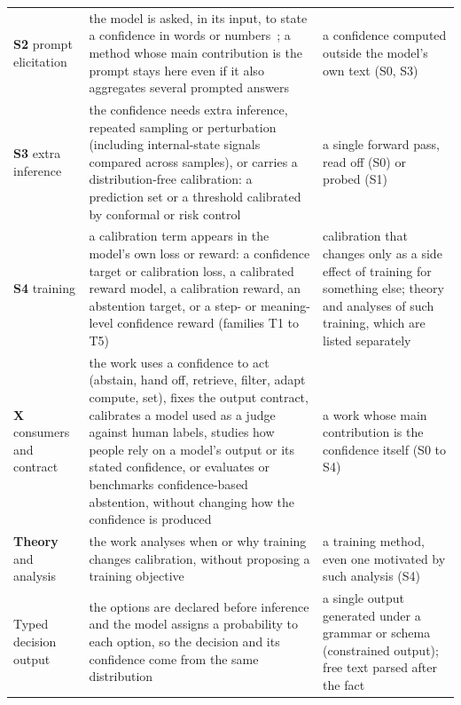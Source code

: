 {\begin{longtable}{@{}>{\raggedright\arraybackslash}p{}
                   >{\raggedright\arraybackslash}p{}
                   >{\raggedright\arraybackslash}p{}@{}}
\textcolor{stS2txt}{\textbf{S2}} prompt elicitation & the model is asked, in its input, to state a confidence in words or numbers~\citep{tian2023just}; a method whose main contribution is the prompt stays here even if it also aggregates several prompted answers & a confidence computed outside the model's own text (S0, S3) \\
\textcolor{stS3txt}{\textbf{S3}} extra inference & the confidence needs extra inference, repeated sampling or perturbation (including internal-state signals compared across samples), or carries a distribution-free calibration: a prediction set or a threshold calibrated by conformal or risk control~\citep{farquhar2024semantic,campos2024conformal} & a single forward pass, read off (S0) or probed (S1) \\
\textcolor{stS4txt}{\textbf{S4}} training & a calibration term appears in the model's own loss or reward: a confidence target or calibration loss, a calibrated reward model, a calibration reward, an abstention target, or a step- or meaning-level confidence reward (families T1 to T5)~\citep{leng2024taming,baniharouni2025rewarding} & calibration that changes only as a side effect of training for something else; theory and analyses of such training, which are listed separately \\
\textcolor{stXtxt}{\textbf{X}} consumers and contract & the work uses a confidence to act (abstain, hand off, retrieve, filter, adapt compute, set), fixes the output contract, calibrates a model used as a judge against human labels, studies how people rely on a model's output or its stated confidence, or evaluates or benchmarks confidence-based abstention, without changing how the confidence is produced & a work whose main contribution is the confidence itself (S0 to S4) \\
\textcolor{stTHtxt}{\textbf{Theory}} and analysis & the work analyses when or why training changes calibration, without proposing a training objective & a training method, even one motivated by such analysis (S4) \\
\midrule
Typed decision output & the options are declared before inference and the model assigns a probability to each option, so the decision and its confidence come from the same distribution & a single output generated under a grammar or schema (constrained output); free text parsed after the fact \\

\end{longtable}}
